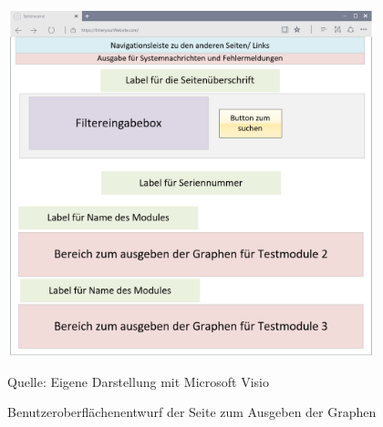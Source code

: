 \begin{figure}[H]
    \centering
    \includegraphics[width=0.95\textwidth]{Grafiken/Overlay_Ausgabeseite}
    \caption{Benutzeroberflächenentwurf der Seite zum Ausgeben der Graphen}
    \label{fig: Benutzeroberflächenentwurf der Seite zum Ausgeben der Graphen}
    {Quelle: Eigene Darstellung mit Microsoft Visio}
\end{figure}